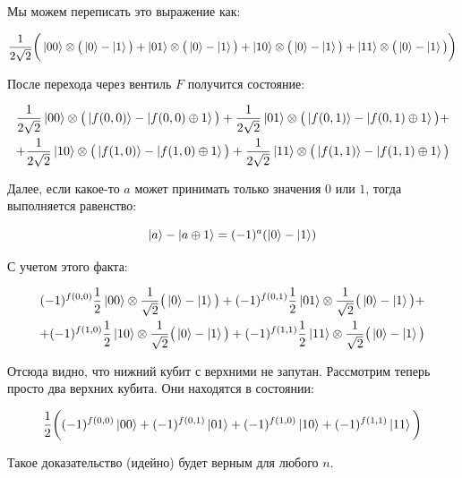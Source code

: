 \documentclass[a4paper, 12pt]{article}
\begin{document}
Мы можем переписать это выражение как:

\begin{equation}
	\frac{1}{2\sqrt{2}}\bigg(\ket{00} \otimes \big(\ket{0} - \ket{1}\big) + \ket{01} \otimes \big(\ket{0} - \ket{1}\big) + \ket{10} \otimes \big(\ket{0} - \ket{1}\big) + \ket{11} \otimes \big(\ket{0} - \ket{1}\big) \bigg)
\end{equation}

После перехода через вентиль $F$ получится состояние:

\begin{align*}
	\frac{1}{2\sqrt{2}} \ket{00} \otimes \big(\ket{f(0, 0)} - \ket{f(0, 0) \oplus 1}\big) + \frac{1}{2\sqrt{2}} \ket{01} \otimes \big(\ket{f(0, 1)} - \ket{f(0, 1) \oplus 1}\big) + \\
	+ \frac{1}{2\sqrt{2}} \ket{10} \otimes \big(\ket{f(1, 0)} - \ket{f(1, 0) \oplus 1}\big) + \frac{1}{2\sqrt{2}} \ket{11} \otimes \big(\ket{f(1, 1)} - \ket{f(1, 1) \oplus 1}\big)
\end{align*}

Далее, если какое-то $a$ может принимать только значения $0$ или $1$, тогда выполняется равенство:

\begin{equation}
	\ket{a} - \ket{a\oplus 1} = (-1)^a (\ket{0} - \ket{1})
\end{equation}

С учетом этого факта:

\begin{align}
	(-1)^{f(0, 0)} \frac{1}{2} \ket{00} \otimes \frac{1}{\sqrt{2}} \big(\ket{0} - \ket{1}\big) + (-1)^{f(0, 1)} \frac{1}{2} \ket{01} \otimes \frac{1}{\sqrt{2}} \big(\ket{0} - \ket{1}\big) + \\
	+ (-1)^{f(1, 0)} \frac{1}{2} \ket{10} \otimes \frac{1}{\sqrt{2}} \big(\ket{0} - \ket{1}\big) + (-1)^{f(1, 1)} \frac{1}{2} \ket{11} \otimes \frac{1}{\sqrt{2}} \big(\ket{0} - \ket{1}\big)
\end{align}

Отсюда видно, что нижний кубит с верхними не запутан. Рассмотрим теперь просто два верхних кубита. Они находятся в состоянии:

\begin{equation}
	\frac{1}{2}\bigg((-1)^{f(0, 0)} \ket{00} + (-1)^{f(0, 1)}\ket{01} + (-1)^{f(1, 0)}\ket{10} + (-1)^{f(1, 1)}\ket{11}\bigg)
\end{equation}

Такое доказательство (идейно) будет верным для любого $n$. 
\end{document}
